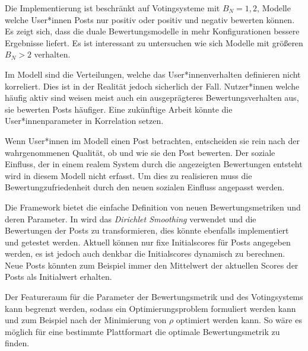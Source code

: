 Die Implementierung ist beschränkt auf Votingsysteme mit  $B_N = {1,2}$, Modelle welche User*innen Posts nur positiv oder positiv und negativ bewerten können. Es zeigt sich, dass die duale Bewertungsmodelle in mehr Konfigurationen bessere Ergebnisse liefert. Es ist interessant zu untersuchen wie sich Modelle mit größeren $B_N > 2$ verhalten.

Im Modell sind die Verteilungen, welche das User*innenverhalten definieren nicht korreliert. Dies ist in der Realität jedoch sicherlich der Fall. Nutzer*innen welche häufig aktiv sind weisen meist auch ein ausgeprägteres Bewertungsverhalten aus, sie bewerten Posts häufiger. Eine zukünftige Arbeit könnte die User*innenparameter in Korrelation setzen.

Wenn User*innen im Modell einen Post betrachten, entscheiden sie rein nach der wahrgenommenen Qualität, ob und wie sie den Post bewerten. Der soziale Einfluss, der in einem realem System durch die angezeigten Bewertungen entsteht wird in diesem Modell nicht erfasst. Um dies zu realisieren muss die Bewertungzufriedenheit durch den neuen sozialen Einfluss angepasst werden.

Die Framework bietet die einfache Definition von neuen Bewertungsmetriken und deren Parameter. In \cite{dietze} wird das \textit{Dirichlet Smoothing} verwendet und die Bewertungen der Posts zu transformieren, dies könnte ebenfalls implementiert und getestet werden. Aktuell können nur fixe Initialscores für Posts angegeben werden, es ist jedoch auch denkbar die Initialscores dynamisch zu berechnen. Neue Posts könnten zum Beispiel immer den Mittelwert der aktuellen Scores der Posts als Initialwert erhalten.

Der Featureraum für die Parameter der Bewertungsmetrik und des Votingsystems kann begrenzt werden, sodass ein Optimierungsproblem formuliert werden kann und zum Beispiel nach der Minimierung von $\rho$ optimiert werden kann. So wäre es möglich für eine bestimmte Plattformart die optimale Bewertungsmetrik zu finden.
